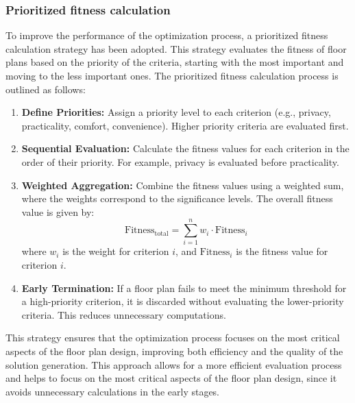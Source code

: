 \documentclass[]{article}
\begin{document}
\subsubsection{Prioritized fitness calculation}
To improve the performance of the optimization process, a prioritized fitness calculation strategy has been adopted. This strategy evaluates the fitness of floor plans based on the priority of the criteria, starting with the most important and moving to the less important ones. The prioritized fitness calculation process is outlined as follows:

\begin{enumerate}
    \item \textbf{Define Priorities:} Assign a priority level to each criterion (e.g., privacy, practicality, comfort, convenience). Higher priority criteria are evaluated first.
    \item \textbf{Sequential Evaluation:} Calculate the fitness values for each criterion in the order of their priority. For example, privacy is evaluated before practicality.
    \item \textbf{Weighted Aggregation:} Combine the fitness values using a weighted sum, where the weights correspond to the significance levels. The overall fitness value is given by:
          \begin{equation*}
              \text{Fitness}_{\text{total}} = \sum_{i=1}^{n} w_i \cdot \text{Fitness}_i
          \end{equation*}
          where $w_i$ is the weight for criterion $i$, and $\text{Fitness}_i$ is the fitness value for criterion $i$.
    \item \textbf{Early Termination:} If a floor plan fails to meet the minimum threshold for a high-priority criterion, it is discarded without evaluating the lower-priority criteria. This reduces unnecessary computations.
\end{enumerate}

This strategy ensures that the optimization process focuses on the most critical aspects of the floor plan design, improving both efficiency and the quality of the solution generation.
This approach allows for a more efficient evaluation process and helps to focus on the most critical aspects of the floor plan design, since it avoids unnecessary calculations in the early stages.
\end{document}
